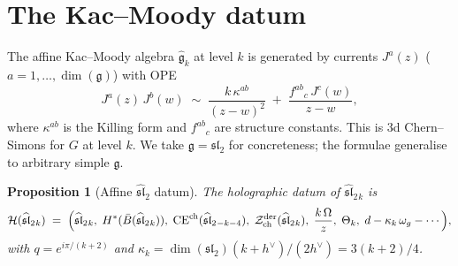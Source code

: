 \documentclass[11pt,reqno]{amsart}
\newtheorem{proposition}[theorem]{Proposition}
\theoremstyle{definition}
\theoremstyle{remark}
\newcommand{\cH}{\mathcal{H}}
\newcommand{\cZ}{\mathcal{Z}}
\newcommand{\barB}{\bar{B}}
\newcommand{\fg}{\mathfrak{g}}
\newcommand{\fsl}{\mathfrak{sl}}
\numberwithin{equation}{section}
\begin{document}
\section{The Kac--Moody datum}\label{sec:km}

The affine Kac--Moody algebra $\widehat{\fg}_k$ at level $k$
is generated by currents $J^a(z)$ ($a = 1, \ldots, \dim(\fg)$)
with OPE
\begin{equation}\label{eq:km-ope}
J^a(z)\,J^b(w)
\;\sim\;
\frac{k\,\kappa^{ab}}{(z-w)^2}
\;+\;
\frac{f^{ab}{}_c\,J^c(w)}{z-w},
\end{equation}
where $\kappa^{ab}$ is the Killing form and $f^{ab}{}_c$ are
structure constants. This is 3d Chern--Simons for $G$ at level $k$.
We take $\fg = \fsl_2$ for concreteness; the formulae generalise to
arbitrary simple $\fg$.

\begin{proposition}[Affine $\widehat{\fsl}_2$ datum]
\label{prop:km-datum}
The holographic datum of $\widehat{\fsl}_2{}_k$ is
\begin{equation}\label{eq:km-datum}
\cH(\widehat{\fsl}_2{}_k) \;=\;
\Bigl(
\widehat{\fsl}_2{}_k,\;
H^*(\barB(\widehat{\fsl}_2{}_k)),\;
\mathrm{CE}^{\mathrm{ch}}(\widehat{\fsl}_2{}_{-k-4}),\;
\cZ^{\mathrm{der}}_{\mathrm{ch}}(\widehat{\fsl}_2{}_k),\;
\frac{k\,\Omega}{z},\;
\Theta_k,\;
d - \kappa_k\,\omega_g - \cdots
\Bigr),
\end{equation}
with $q = e^{i\pi/(k+2)}$ and
$\kappa_k = \dim(\fsl_2)(k+h^\vee)/(2h^\vee) = 3(k+2)/4$.
\end{proposition}
\end{document}
